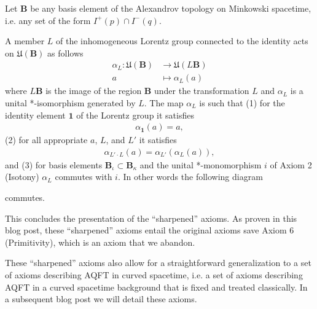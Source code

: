 \begin{axiom}
    \label{axm:lorentz-covariance}
    Let $\mathbf{B}$ be any basis element of the Alexandrov topology on Minkowski spacetime, i.e. any set of the form $I^+(p) \cap I^-(q)$.
    
    A member $L$ of the inhomogeneous Lorentz group connected to the identity acts on $\mathfrak{U}(\mathbf{B})$ as follows
    \begin{align}
        \alpha_L : \mathfrak{U}(\mathbf{B}) &\longrightarrow \mathfrak{U}(L\mathbf{B}) \\
                             a              &\longmapsto     \alpha_L(a)
    \end{align}
    where $L\mathbf{B}$ is the image of the region $\mathbf{B}$ under the transformation $L$ and $\alpha_L$ is a unital *-isomorphism generated by $L$. The map $\alpha_L$ is such that (1) for the identity element $\mathbf{1}$ of the Lorentz group it satisfies
    \begin{align}
        \alpha_{\mathbf{1}}(a) = a,
    \end{align}
    (2) for all appropriate $a$, $L$, and $L'$ it satisfies
    \begin{align}
        \alpha_{L' \cdot L}(a) = \alpha_{L'}(\alpha_{L}(a)),
    \end{align}
    and (3) for basis elements $\mathbf{B}_\iota \subset \mathbf{B}_\kappa$ and the unital *-monomorphism $i$ of Axiom 2 (Isotony) $\alpha_L$ commutes with $i$. In other words the following diagram
    
    \begin{center}
    \end{center}
    
    commutes.
\end{axiom}


This concludes the presentation of the ``sharpened'' axioms. As proven in this blog post, these ``sharpened'' axioms entail the original axioms save Axiom 6 (Primitivity), which is an axiom that we abandon.

These ``sharpened'' axioms also allow for a straightforward generalization to a set of axioms describing AQFT in curved spacetime, i.e. a set of axioms describing AQFT in a curved spacetime background that is fixed and treated classically. In a subsequent blog post we will detail these axioms.
